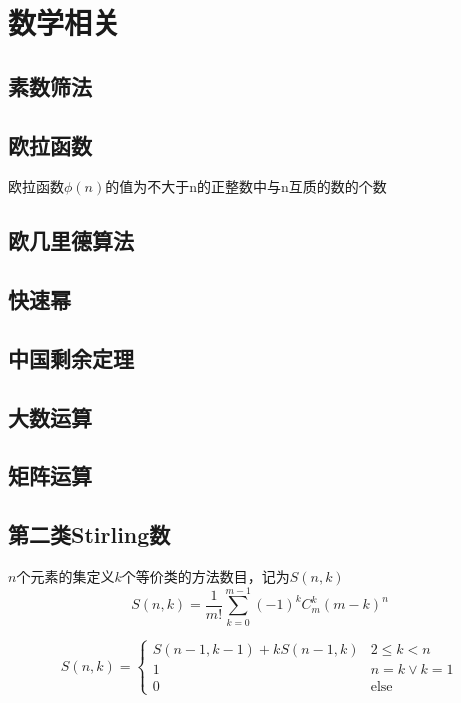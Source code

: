 
\section{数学相关}

\subsection{素数筛法}

\subsection{欧拉函数}
欧拉函数$\phi(n)$的值为不大于n的正整数中与n互质的数的个数

\subsection{欧几里德算法}

\subsection{快速幂}

\subsection{中国剩余定理}

\subsection{大数运算}

\subsection{矩阵运算}

\subsection{第二类Stirling数}
$n$个元素的集定义$k$个等价类的方法数目，记为$S(n,k)$
\begin{displaymath}
S(n, k) = \frac{1}{m!}\sum_{k=0}^{m-1}{(-1)^k C_m^k (m-k)^n}
\end{displaymath}

\begin{displaymath}
S(n, k) = 
\begin{cases}
S(n-1, k-1) + kS(n-1, k) & 2\leqslant k < n\\
1 & n=k \vee k=1 \\
0 & \text{else}
\end{cases}
\end{displaymath}
$$ $$

